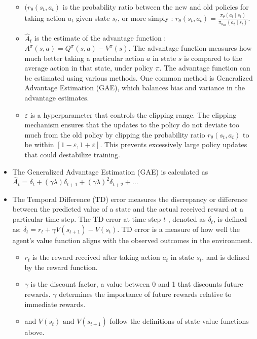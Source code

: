 \documentclass[12pt,oneside,letterpaper]{article}
\begin{document}
\begin{itemize}
\begin{itemize} 
\item $(r_\theta(s_t, a_t)$ is the probability ratio between the new and old policies for taking action $a_t$ given state $s_t$, or more simply : \( r_\theta(s_t, a_t) = \frac{\pi_\theta(a_t \mid s_t)}{\pi_{\theta_{\text{old}}}(a_t \mid s_t)} \). 
\item \( \hat{A}_t \) is the estimate of the advantage function : \( A^\pi(s, a) = Q^\pi(s, a) - V^\pi(s) \).  The advantage function measures how much better taking a particular action $a$ in state $s$ is compared to the average action in that state, under policy $\pi$. The advantage function can be estimated using various methods. One common method is Generalized Advantage Estimation (GAE), which balances bias and variance in the advantage estimates.
\item $\varepsilon$ is a hyperparameter that controls the clipping range. The clipping mechanism ensures that the updates to the policy do not deviate too much from the old policy by clipping the probability ratio $r_\theta(s_t, a_t)$ to be within  \( [1 - \varepsilon, 1 + \varepsilon]\). This prevents excessively large policy updates that could destabilize training.
\end{itemize}
\item The Generalized Advantage Estimation (GAE) is calculated as \( \hat{A}_t = \delta_t + (\gamma \lambda) \delta_{t+1} + (\gamma \lambda)^2 \delta_{t+2} + \ldots \)

\item The Temporal Difference (TD) error measures the discrepancy or difference between the predicted value of a state and the actual received reward at a particular time step. The TD error at time step $t$ , denoted as $\delta_t$, is defined as: \( \delta_t = r_t + \gamma V(s_{t+1}) - V(s_t) \). TD error is a measure of how well the agent's value function aligns with the observed outcomes in the environment.
\begin{itemize}
\item $r_t$ is the reward received after taking action $a_t$ in state $s_t$, and is defined by the reward function.
\item $\gamma$  is the discount factor, a value between 0 and 1 that discounts future rewards. $\gamma$ determines the importance of future rewards relative to immediate rewards.
\item and $V(s_t) \text{ and } V(s_{t + 1}) $ follow the definitions of state-value functions above.
\end{itemize}
\end{itemize}
\end{document}
